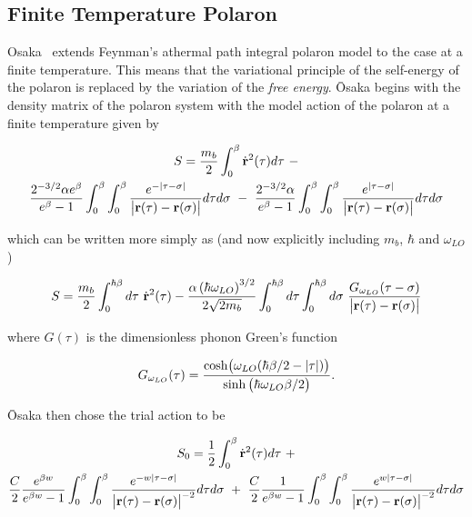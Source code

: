 \subsection{Finite Temperature Polaron}
\label{subsec:2-2-3}

Osaka~\cite{osaka_polaron_1959} extends Feynman's athermal path integral polaron model to the case at a finite temperature. This means that the variational principle of the self-energy of the polaron is replaced by the variation of the \emph{free energy}. \=Osaka begins with the density matrix of the polaron system with the model action of the polaron at a finite temperature given by

\begin{equation}
    \begin{gathered}
    S = \frac{m_b}{2} \int_0^\beta \dot{\vb{r}}^2(\tau) d\tau\ -\\ \frac{2^{-3/2}\alpha e^\beta}{e^\beta - 1} \int_0^\beta \int_0^\beta \frac{e^{-|\tau-\sigma|}}{\left| \vb{r}(\tau) - \vb{r}(\sigma) \right|} d\tau d\sigma \ -\  \frac{2^{-3/2}\alpha}{e^\beta - 1} \int_0^\beta \int_0^\beta \frac{e^{|\tau-\sigma|}}{\left| \vb{r}(\tau) - \vb{r}(\sigma) \right|} d\tau d\sigma
    \end{gathered}
\end{equation}

which can be written more simply as (and now explicitly including $m_b$, $\hbar$ and $\omega_{LO}$)

\begin{equation}\label{eqn:thermal_action}
    S = \frac{m_b}{2} \int_0^{\hbar\beta} d\tau\ \dot{\vb{r}}^2(\tau) - \frac{\alpha \left(\hbar \omega_{LO}\right)^{3/2}}{2\sqrt{2 m_b}} \int_0^{\hbar\beta} d\tau \int_0^{\hbar\beta} d\sigma\ \frac{G_{\omega_{LO}}(\tau - \sigma)}{\abs{\vb{r}(\tau) - \vb{r}(\sigma)}}
\end{equation}

where $G(\tau)$ is the dimensionless phonon Green's function

\begin{equation}
    G_{\omega_{LO}}(\tau) = \frac{\cosh(\omega_{LO} (\hbar\beta/2 - \abs{\tau}))}{\sinh\left(\hbar\omega_{LO}\beta/2\right)}.
\end{equation}

\=Osaka then chose the trial action to be

\begin{equation}
    \begin{gathered}
    S_0 = \frac{1}{2} \int_0^\beta \dot{\vb{r}}^2(\tau) d\tau\ +\\ \frac{C}{2}\frac{e^{\beta w}}{e^{\beta w} - 1} \int_0^\beta \int_0^\beta \frac{e^{-w|\tau-\sigma|}}{\left| \vb{r}(\tau) - \vb{r}(\sigma) \right|^{-2}} d\tau d\sigma \ +\ \frac{C}{2}\frac{1}{e^{\beta w} - 1} \int_0^\beta \int_0^\beta \frac{e^{w|\tau-\sigma|}}{\left| \vb{r}(\tau) - \vb{r}(\sigma) \right|^{-2}} d\tau d\sigma
    \end{gathered}
\end{equation}

